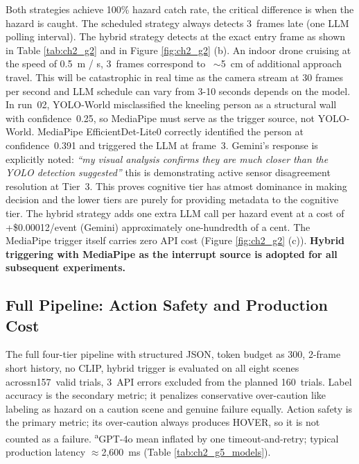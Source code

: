 Both strategies achieve 100\% hazard catch rate, the critical difference is when the hazard is caught. 
The scheduled strategy always detects 3~frames late (one LLM polling interval).
The hybrid strategy detects at the exact entry frame as shown in Table \ref{tab:ch2_g2} and in Figure \ref{fig:ch2_g2} (b). 
An indoor drone cruising at the speed of 0.5~m / s, 3~frames correspond to ~$\sim$5~cm of additional approach travel. 
This will be catastrophic in real time as the camera stream at 30 frames per second and LLM schedule can vary from 3-10 seconds depends on the model.
In run~02, YOLO-World misclassified the kneeling person as a structural wall with confidence~0.25, so MediaPipe must serve as the trigger source, not YOLO-World. 
MediaPipe EfficientDet-Lite0 correctly identified the person at confidence~0.391 and triggered the LLM at frame~3. 
Gemini's response is explicitly noted: \emph{``my visual analysis confirms they are much closer than the YOLO detection suggested''} this is demonstrating active sensor disagreement resolution at Tier~3. 
This proves cognitive tier has atmost dominance in making decision and the lower tiers are purely for providing metadata to the cognitive tier.
The hybrid strategy adds one extra LLM call per hazard event at a cost of +\$0.00012/event (Gemini) approximately one-hundredth of a cent. The MediaPipe trigger itself carries zero API cost (Figure \ref{fig:ch2_g2} (c)).
\textbf{Hybrid triggering with MediaPipe as the interrupt source is adopted for all subsequent experiments.}

\subsection{Full Pipeline: Action Safety and Production Cost}
\label{sec:ch2_g5}

The full four-tier pipeline with structured JSON, token budget as 300, 2-frame short history, no CLIP, hybrid trigger is evaluated on all eight scenes acrossn157~valid trials, 3~API errors excluded from the planned 160~trials.
Label accuracy is the secondary metric; it penalizes conservative over-caution like labeling as hazard on a caution scene and genuine failure equally.
Action safety is the primary metric; its over-caution always produces HOVER, so it is not counted as a failure.
\textsuperscript{a}GPT-4o mean inflated by one timeout-and-retry; typical production latency $\approx$2,600~ms (Table \ref{tab:ch2_g5_models}).

